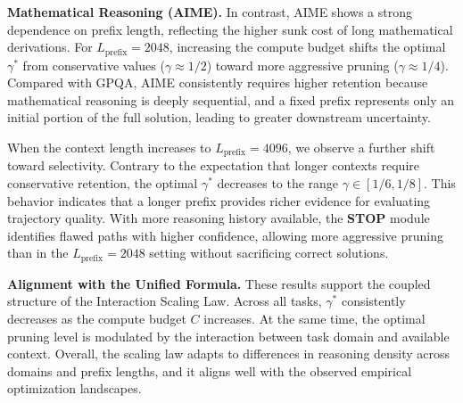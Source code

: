 \documentclass[11pt]{article}
\theoremstyle{plain}
\begin{document}
\noindent\textbf{Mathematical Reasoning (AIME).}
In contrast, AIME shows a strong dependence on prefix length, reflecting the higher sunk cost of long mathematical derivations. For $L_{\text{prefix}}=2048$, increasing the compute budget shifts the optimal $\gamma^*$ from conservative values ($\gamma \approx 1/2$) toward more aggressive pruning ($\gamma \approx 1/4$). Compared with GPQA, AIME consistently requires higher retention because mathematical reasoning is deeply sequential, and a fixed prefix represents only an initial portion of the full solution, leading to greater downstream uncertainty.

When the context length increases to $L_{\text{prefix}}=4096$, we observe a further shift toward selectivity. Contrary to the expectation that longer contexts require conservative retention, the optimal $\gamma^*$ decreases to the range $\gamma \in [1/6, 1/8]$. This behavior indicates that a longer prefix provides richer evidence for evaluating trajectory quality. With more reasoning history available, the \textbf{STOP} module identifies flawed paths with higher confidence, allowing more aggressive pruning than in the $L_{\text{prefix}}=2048$ setting without sacrificing correct solutions.

\noindent\textbf{Alignment with the Unified Formula.}
These results support the coupled structure of the Interaction Scaling Law. Across all tasks, $\gamma^*$ consistently decreases as the compute budget $C$ increases. At the same time, the optimal pruning level is modulated by the interaction between task domain and available context. Overall, the scaling law adapts to differences in reasoning density across domains and prefix lengths, and it aligns well with the observed empirical optimization landscapes.

  
\end{document}

